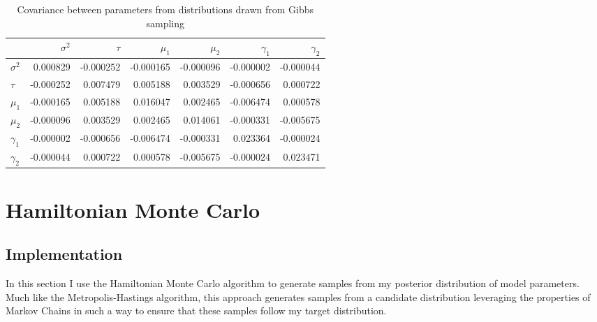 \documentclass{article}
\begin{document}
\begin{table}[H]
  \begin{center}
    \begin{tabular}{lrrrrrr}
      {} & $\sigma^2$ & $\tau$ & $\mu_1$ & $\mu_2$ & $\gamma_1$ & $\gamma_2$ \\
      \midrule
      $\sigma^2$   &  0.000829 & -0.000252 & -0.000165 & -0.000096 & -0.000002 & -0.000044 \\
      $\tau$  & -0.000252 &  0.007479 &  0.005188 &  0.003529 & -0.000656 &  0.000722 \\
      $\mu_1$  & -0.000165 &  0.005188 &  0.016047 &  0.002465 & -0.006474 &  0.000578 \\
      $\mu_2$  & -0.000096 &  0.003529 &  0.002465 &  0.014061 & -0.000331 & -0.005675 \\
      $\gamma_1$ & -0.000002 & -0.000656 & -0.006474 & -0.000331 &  0.023364 & -0.000024 \\
      $\gamma_2$ & -0.000044 &  0.000722 &  0.000578 & -0.005675 & -0.000024 &  0.023471 \\
      \bottomrule
      \end{tabular}
  \end{center}
  \caption{\label{tab:gibbs_covar} Covariance between parameters from distributions drawn from Gibbs sampling}
\end{table}




\section{Hamiltonian Monte Carlo}
\subsection{Implementation}
In this section I use the Hamiltonian Monte Carlo algorithm to generate samples from my posterior distribution of model parameters. Much like the Metropolis-Hastings algorithm, this approach generates samples from a candidate distribution leveraging the properties of Markov Chains in such a way to ensure that these samples follow my target distribution.
\end{document}
